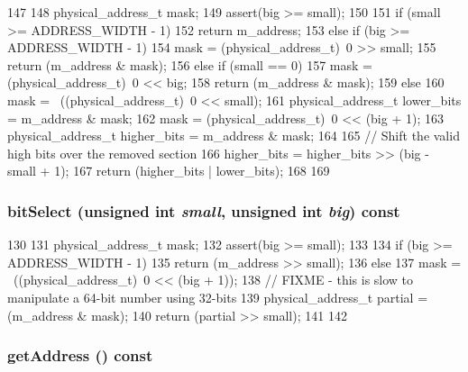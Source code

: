 \begin{DoxyCode}
147 {
148     physical_address_t mask;
149     assert(big >= small);
150 
151     if (small >= ADDRESS_WIDTH - 1) {
152         return m_address;
153     } else if (big >= ADDRESS_WIDTH - 1) {
154         mask = (physical_address_t)~0 >> small;
155         return (m_address & mask);
156     } else if (small == 0) {
157         mask = (physical_address_t)~0 << big;
158         return (m_address & mask);
159     } else {
160         mask = ~((physical_address_t)~0 << small);
161         physical_address_t lower_bits = m_address & mask;
162         mask = (physical_address_t)~0 << (big + 1);
163         physical_address_t higher_bits = m_address & mask;
164 
165         // Shift the valid high bits over the removed section
166         higher_bits = higher_bits >> (big - small + 1);
167         return (higher_bits | lower_bits);
168     }
169 }
\end{DoxyCode}
\hypertarget{classAddress_a22669386ccc1e2491c7c46f55c37a038}{
\subsubsection[{bitSelect}]{ bitSelect (unsigned int {\em small}, \/  unsigned int {\em big}) const}}
\label{classAddress_a22669386ccc1e2491c7c46f55c37a038}



\begin{DoxyCode}
130 {
131     physical_address_t mask;
132     assert(big >= small);
133 
134     if (big >= ADDRESS_WIDTH - 1) {
135         return (m_address >> small);
136     } else {
137         mask = ~((physical_address_t)~0 << (big + 1));
138         // FIXME - this is slow to manipulate a 64-bit number using 32-bits
139         physical_address_t partial = (m_address & mask);
140         return (partial >> small);
141     }
142 }
\end{DoxyCode}
\hypertarget{classAddress_aa5c44fe637d09a708d70c4a689840cd0}{
\subsubsection[{getAddress}]{ getAddress () const}}
\label{classAddress_aa5c44fe637d09a708d70c4a689840cd0}



